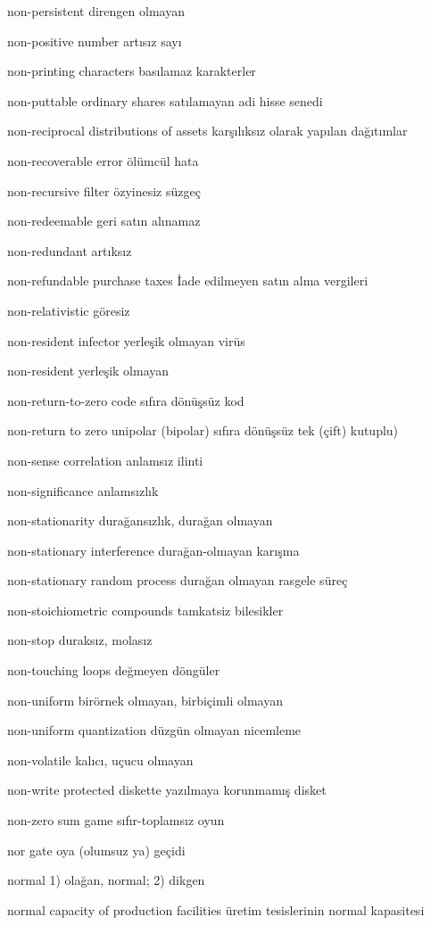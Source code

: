 \documentclass[12pt,fleqn]{article}\usepackage{../../common}
\begin{document}
non-persistent direngen olmayan

non-positive number artısız sayı

non-printing characters basılamaz karakterler

non-puttable ordinary shares satılamayan adi hisse senedi

non-reciprocal distributions of assets karşılıksız olarak yapılan dağıtımlar

non-recoverable error ölümcül hata

non-recursive filter özyinesiz süzgeç

non-redeemable geri satın alınamaz

non-redundant artıksız

non-refundable purchase taxes İade edilmeyen satın alma vergileri

non-relativistic göresiz

non-resident infector yerleşik olmayan virüs

non-resident yerleşik olmayan

non-return-to-zero code sıfıra dönüşsüz kod

non-return to zero unipolar (bipolar) sıfıra dönüşsüz tek (çift) kutuplu)

non-sense correlation anlamsız ilinti

non-significance anlamsızlık

non-stationarity durağansızlık, durağan olmayan

non-stationary interference durağan-olmayan karışma

non-stationary random process durağan olmayan rasgele süreç

non-stoichiometric compounds tamkatsiz bilesikler

non-stop duraksız, molasız

non-touching loops değmeyen döngüler

non-uniform birörnek olmayan, birbiçimli olmayan

non-uniform quantization düzgün olmayan nicemleme

non-volatile kalıcı, uçucu olmayan

non-write protected diskette yazılmaya korunmamış disket

non-zero sum game sıfır-toplamsız oyun

nor gate oya (olumsuz ya) geçidi

normal 1) olağan, normal; 2) dikgen

normal capacity of production facilities üretim tesislerinin normal kapasitesi
\end{document}
